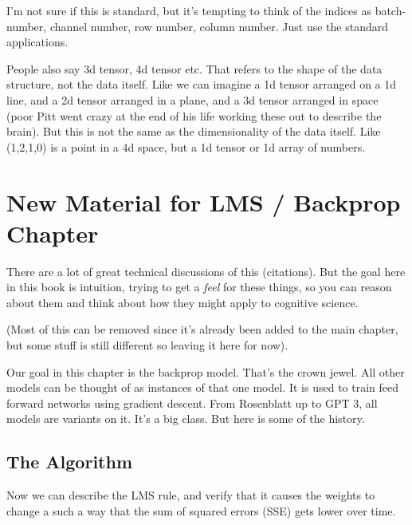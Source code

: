  I'm not sure if this is standard, but it's tempting to think of the indices as batch-number, channel number, row number, column number. Just use the standard applications.

People also say 3d tensor, 4d tensor etc.  That refers to the shape of the data structure, not the data itself.  Like we can imagine a 1d tensor arranged on a 1d line, and a 2d tensor arranged in a plane, and a 3d tensor arranged in space (poor Pitt went crazy at the end of his life working these out to describe the brain).  But this is not the same as the dimensionality of the data itself. Like (1,2,1,0) is a point in a 4d space, but a 1d tensor or 1d array of numbers.

\section{New Material for LMS / Backprop Chapter}

There are a lot of great technical discussions of this (citations). But the goal here in this book is intuition, trying to get a \emph{feel} for these things, so you can reason about them and think about how they might apply to cognitive science. 

(Most of this can be removed since it's already been added to the main chapter, but some stuff is still different so leaving it here for now).

Our goal in this chapter is the backprop model. That's the crown jewel. All other models can be thought of as instances of that one model. It is used to train feed forward networks using gradient descent. From Rosenblatt up to GPT 3, all models are variants on it. It's a big class. But here is some of the history.

\subsection{The Algorithm}

Now we can describe the LMS rule, and verify that it causes the weights to change a such a way that the sum of squared errors (SSE) gets lower over time.

